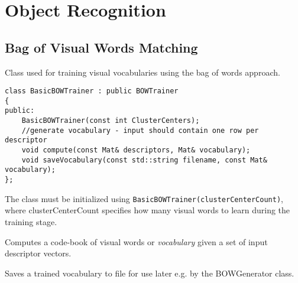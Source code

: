 \section{Object Recognition}

\subsection{Bag of Visual Words Matching}


\ifCpp

Class used for training visual vocabularies using the bag of words approach.

\begin{lstlisting}
class BasicBOWTrainer : public BOWTrainer
{
public:
    BasicBOWTrainer(const int ClusterCenters);
    //generate vocabulary - input should contain one row per descriptor
    void compute(const Mat& descriptors, Mat& vocabulary);
    void saveVocabulary(const std::string filename, const Mat& vocabulary);
};
\end{lstlisting}

The class must be initialized using \texttt{BasicBOWTrainer(clusterCenterCount)}, where clusterCenterCount specifies how many visual words to learn during the training stage.

Computes a code-book of visual words or \emph{vocabulary} given a set of input descriptor vectors.

\begin{description}
\end{description}

Saves a trained vocabulary to file for use later e.g. by the BOWGenerator class.

\begin{description}
\end{description}

